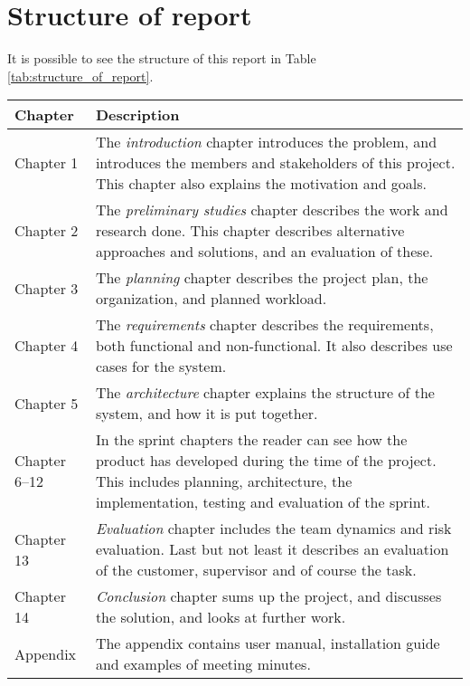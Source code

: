 \section{Structure of report}
It is possible to see the structure of this report in Table \ref{tab:structure_of_report}.
\begin{table*}[!ht]\centering
\caption{List of all chapters and short description}
\label{tab:structure_of_report}
\def\arraystretch{1.3}
\begin{tabularx}{\textwidth}{lX} \toprule[0.5mm]
\textbf{Chapter} & \textbf{Description} \\ \midrule
Chapter 1 & The \emph{introduction} chapter introduces the problem, and introduces the members and stakeholders of this project.
This chapter also explains the motivation and goals. \\

Chapter 2 &  The \emph{preliminary studies} chapter describes the work and research done. This chapter describes alternative approaches and solutions, and an evaluation of these. \\

Chapter 3 &  The \emph{planning} chapter describes the project plan, the organization, and planned workload.  \\

Chapter 4 &  The \emph{requirements} chapter describes the requirements, both functional and non-functional. It also describes use cases for the system. \\

Chapter 5	 &  The \emph{architecture} chapter explains the structure of the system, and how it is put together. \\

Chapter 6--12 	&  In the sprint chapters the reader can see how the product has developed during the time of the project. This includes planning, architecture, the implementation, testing and evaluation of the sprint. \\

Chapter 13 	 &  \emph{Evaluation} chapter includes the team dynamics and risk evaluation. Last but not least it describes an evaluation of the customer, supervisor and of course the task. \\

Chapter 14 	 &  \emph{Conclusion} chapter sums up the project, and discusses the solution, and looks at further work. \\

\midrule
Appendix 	 &   The appendix contains user manual, installation guide and examples of meeting minutes.\\

\bottomrule[0.5mm]
\end{tabularx}
\end{table*}

